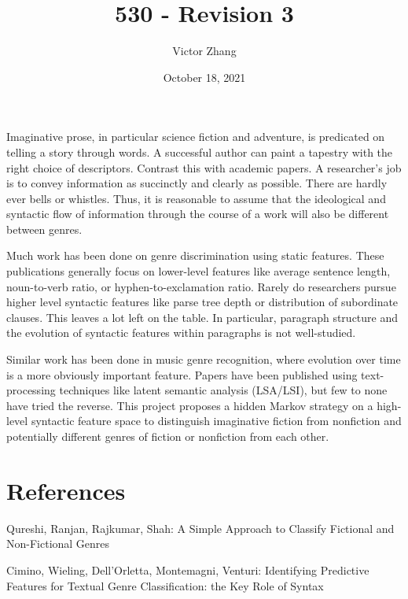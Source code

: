 \documentclass{article}
\title{530 - Revision 3}
\author{Victor Zhang}
\date{October 18, 2021}
\begin{document}
\maketitle

\section{}
Imaginative prose, in particular science fiction and adventure, is predicated on telling a story through words. A successful author can paint a tapestry with the right choice of descriptors. Contrast this with academic papers. A researcher's job is to convey information as succinctly and clearly as possible. There are hardly ever bells or whistles. Thus, it is reasonable to assume that the ideological and syntactic flow of information through the course of a work will also be different between genres.

Much work has been done on genre discrimination using static features. These publications generally focus on lower-level features like average sentence length, noun-to-verb ratio, or hyphen-to-exclamation ratio. Rarely do researchers pursue higher level syntactic features like parse tree depth or distribution of subordinate clauses. This leaves a lot left on the table. In particular, paragraph structure and the evolution of syntactic features within paragraphs is not well-studied.

Similar work has been done in music genre recognition, where evolution over time is a more obviously important feature. Papers have been published using text-processing techniques like latent semantic analysis (LSA/LSI), but few to none have tried the reverse. This project proposes a hidden Markov strategy on a high-level syntactic feature space to distinguish imaginative fiction from nonfiction and potentially different genres of fiction or nonfiction from each other.

\section{References}
Qureshi, Ranjan, Rajkumar, Shah: A Simple Approach to Classify Fictional and Non-Fictional Genres

Cimino, Wieling, Dell'Orletta, Montemagni, Venturi: Identifying Predictive Features for Textual Genre Classification: the Key Role of Syntax
\end{document}
